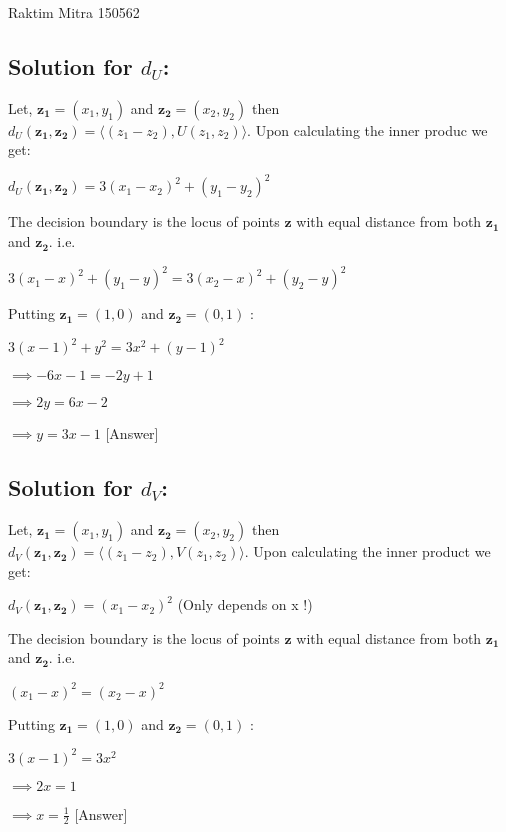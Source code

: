 \documentclass[a4paper,11pt]{article}
\newcommand\tab[1][0.6cm]{\hspace*{#1}}
\begin{document}
								{Raktim Mitra}      						           		%
								{150562}																		%

\begin{mlsolution}
\subsection*{Solution for $d_U$:}
	Let, $\mathbf{z_1}=(x_1,y_1)$ and $\mathbf{z_2}=(x_2,y_2)$ then $d_U(\mathbf{z_1,z_2}) = \langle(z_1 - z_2),U(z_1,z_2) \rangle$. Upon calculating the inner produc we get:
	
	$d_U(\mathbf{z_1,z_2}) = 3(x_1 - x_2)^2 + (y_1 - y_2)^2$
	
	The decision boundary is the locus of points $\mathbf{z}$ with equal distance from both $\mathbf{z_1}$ and $\mathbf{z_2}$. i.e.
	
\tab $3(x_1 - x)^2 + (y_1 - y)^2 = 3(x_2 - x)^2 + (y_2 - y)^2$

Putting $\mathbf{z_1} = (1,0)$ and $\mathbf{z_2} = (0,1)$ :

\tab $3(x-1)^2 + y^2 = 3x^2 + (y-1)^2$

$\implies -6x - 1 = -2y + 1$

$\implies 2y = 6x - 2$

$\implies y = 3x - 1$ [Answer]


% 
\subsection*{Solution for $d_V$:}
	Let, $\mathbf{z_1}=(x_1,y_1)$ and $\mathbf{z_2}=(x_2,y_2)$ then $d_V(\mathbf{z_1,z_2}) = \langle(z_1 - z_2),V(z_1,z_2) \rangle$. Upon calculating the inner product we get:
	
	$d_V(\mathbf{z_1,z_2}) = (x_1 - x_2)^2 $ (Only depends on x !)
	
	The decision boundary is the locus of points $\mathbf{z}$ with equal distance from both $\mathbf{z_1}$ and $\mathbf{z_2}$. i.e.
	
\tab $(x_1 - x)^2  = (x_2 - x)^2$

Putting $\mathbf{z_1} = (1,0)$ and $\mathbf{z_2} = (0,1)$ :

\tab $3(x-1)^2  = 3x^2 $

$\implies 2x = 1$

$\implies x = \frac{1}{2}$ [Answer]


\end{mlsolution}
\end{document}

